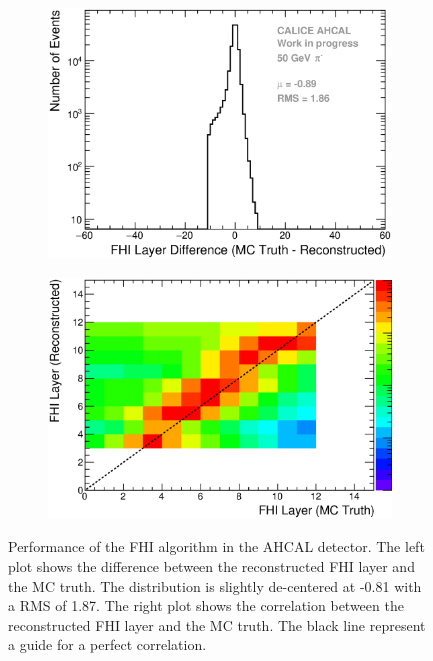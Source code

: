 \begin{figure}[htbp!]
	\begin{subfigure}[t]{0.49\textwidth}
		\centering
		\includegraphics[width=1\textwidth]{../Thesis_Plots/Timing/Pions/Plots/ShowerStart_Difference_noOptimisation.eps}
		\caption{}\label{fig:Diff_FHI_RecoMC}
	\end{subfigure}
	\hfill
	\begin{subfigure}[t]{0.49\textwidth}
		\centering
		\includegraphics[width=1\textwidth]{../Thesis_Plots/Timing/Pions/Plots/ShowerStart_Difference_noOptimisation_2D.eps}
		\caption{}\label{fig:Corr_FHI_RecoMC}
	\end{subfigure}
	\caption{Performance of the FHI algorithm in the AHCAL detector. The left plot shows the difference between the reconstructed FHI layer and the MC truth. The distribution is slightly de-centered at -0.81 with a RMS of 1.87. The right plot shows the correlation between the reconstructed FHI layer and the MC truth. The black line represent a guide for a perfect correlation.}
	\label{fig:FHIAlgo}
\end{figure}


